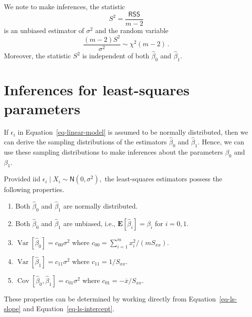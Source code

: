 \documentclass[
  a4paper,
  DIV=11,
  numbers=noendperiod,
  oneside]{scrreprt}
\providecommand{\tightlist}{%
  \setlength{\itemsep}{0pt}\setlength{\parskip}{0pt}}
\theoremstyle{plain}
\theoremstyle{definition}
\theoremstyle{definition}
\theoremstyle{definition}
\theoremstyle{plain}
\theoremstyle{remark}
\begin{document}
We note to make inferences, the statistic \[
 S^2 = \frac{\mathsf{RSS}}{m-2}
\] is an unbiased estimator of \(\sigma^2\) and the random variable \[
 \frac{(m-2) S^2}{\sigma^2} \sim \chi^2(m-2)\,.
\] Moreover, the statistic \(S^2\) is independent of both
\(\widehat{\beta}_0\) and \(\widehat{\beta}_1.\)

\section{Inferences for least-squares
parameters}\label{sec-inference-ls}

If \(\epsilon_i\) in Equation~\ref{eq-linear-model} is assumed to be
normally distributed, then we can derive the sampling distributions of
the estimators \(\widehat{\beta}_0\) and \(\widehat{\beta}_1.\) Hence,
we can use these sampling distributions to make inferences about the
parameters \(\beta_0\) and \(\beta_1.\)

Provided iid \(\epsilon_i \mid X_i \sim \mathsf{N}(0, \sigma^2),\) the
least-squares estimators possess the following properties.

\begin{enumerate}
\def\labelenumi{\arabic{enumi}.}
\tightlist
\item
  Both \(\widehat{\beta}_0\) and \(\widehat{\beta}_1\) are normally
  distributed.
\item
  Both \(\widehat{\beta}_0\) and \(\widehat{\beta}_1\) are unbiased,
  i.e., \(\mathbf{E}[\widehat{\beta}_i] = \beta_i\) for \(i = 0,1.\)
\item
  \(\mathop{\mathrm{Var}}[\widehat{\beta}_0] = c_{00} \sigma^2\) where
  \(c_{00} = \sum_{i=1}^m x_i^2 / (m S_{xx}).\)
\item
  \(\mathop{\mathrm{Var}}[\widehat{\beta}_1] = c_{11} \sigma^2\) where
  \(c_{11} = 1/S_{xx}.\)
\item
  \(\mathop{\mathrm{Cov}}[\widehat{\beta}_0, \widehat{\beta}_1] = c_{01} \sigma^2\)
  where \(c_{01} = - \overline{x} / S_{xx}.\)
\end{enumerate}

These properties can be determined by working directly from
Equation~\ref{eq-ls-slope} and Equation~\ref{eq-ls-intercept}.
\end{document}
